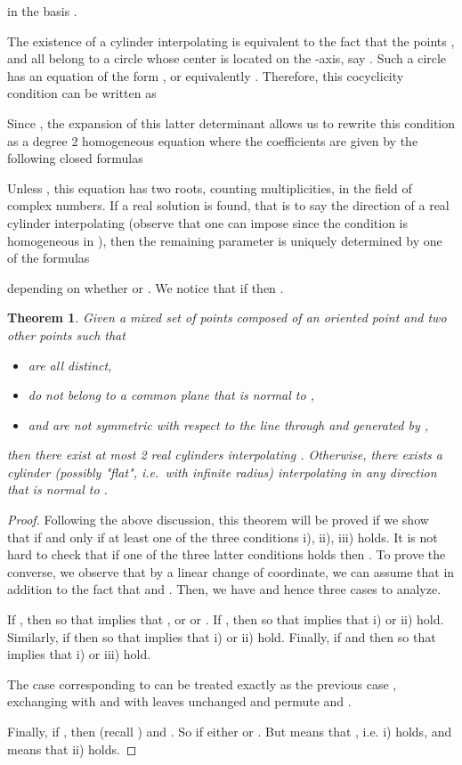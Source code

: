 \documentclass[5p]{elsarticle}
\newtheorem{thm}{Theorem}
\newcommand{\com}[1]{{\color{black} #1}}
\begin{document}
in the basis . 

The existence of a cylinder interpolating  is equivalent to the fact that the points ,  and  \com{all belong to} a circle whose center  is located on the -axis, say . Such a circle has an equation of the form , or equivalently . Therefore, this cocyclicity condition can be written as

Since , the expansion of this latter determinant \com{allows us to} rewrite this condition as a
degree 2 homogeneous equation  where the coefficients  are given by the following closed formulas


   
Unless , this equation has two roots, counting multiplicities, in the field of complex numbers.  If a real solution is found, that is to say the direction of a real cylinder interpolating  (observe that one can impose  since the condition is homogeneous in ), then the remaining parameter  is uniquely determined by  
one of the formulas

depending \com{on} whether  or . We notice that if  then . 

\begin{thm}\label{thm:cyl1N2P} Given a mixed set of points  composed of an oriented point  and two other points  such that 
	\begin{itemize}
		\item[i)]  are all distinct,
		\item[ii)]  do not belong to \com{a common plane that} is normal to ,
		\item[iii)]  and  are not symmetric with respect to the line through  and generated by , 
	\end{itemize} 
then there exist at most 2 real cylinders interpolating . Otherwise, \com{there exists} a cylinder (possibly "flat", i.e.~with infinite radius) interpolating  in any direction \com{that} is normal to .
\end{thm}
\begin{proof}
Following the above discussion, this theorem will be proved if we show that  if and only if at least one of the three conditions i), ii), iii) holds. It is not hard to check that if one of the three latter conditions holds then . To prove the converse, we observe that by a linear change of coordinate, we can assume that  in addition to the fact that  and . Then, we have  and hence three cases to analyze. 


If , then  so that  implies that , or  or . If , then  so that  implies that i) or ii) hold. Similarly, if  then  so that  implies that i) or ii) hold. Finally, if  and  then 
 so that  implies that i) or iii) hold.  

The case corresponding to  can be treated exactly as the previous case ,  exchanging  with  and  with  \com{leaves  unchanged}  and permute  and .

Finally, if , then  (recall ) and . So  if either  or . But  means that , i.e. i) holds, and  means that ii) holds. 	
\end{proof}
\end{document}
